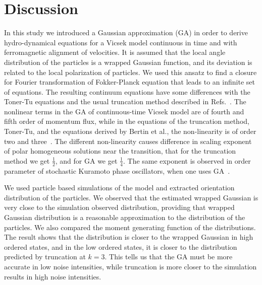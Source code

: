\documentclass[reprint,floatfix,amsmath,amssymb,aps,pre,showkeys,showpacs,superscriptaddress]{revtex4-1}
\newcommand{\hl}[1]{\textcolor{hlcolor}{#1}}
\begin{document}
\section{Discussion}

In this study we introduced a Gaussian approximation (GA) in order to derive hydro-dynamical equations for a Vicsek model continuous in time and with ferromagnetic alignment of velocities. It is assumed that the local angle distribution of the particles is a wrapped Gaussian function, and its deviation is related to the local polarization of particles. We used this ansatz to find a closure for Fourier transformation of Fokker-Planck equation that leads to an infinite set of equations. The resulting continuum equations have some differences with the Toner-Tu equations and the usual truncation method described in Refs.~\cite{Bertin2006,Bertin2009}. The nonlinear terms in the GA of continuous-time Vicsek model are of \hl{fourth} and fifth order of momentum flux, while in the equations of the truncation method, \hl{Toner-Tu, and the equations derived by Bertin et al.}, the non-linearity is of order two and three~\cite{Bertin2006,Bertin2009,Toner1995}. The different non-linearity causes difference in scaling exponent of polar homogeneous solutions near the transition, that for the truncation method we get $\frac{1}{2}$, and for GA we get $\frac{1}{4}$. The same exponent is observed in order parameter of stochastic Kuramoto phase oscillators, when one uses GA~\cite{sonnenschein2013approximate,sonnenschein2013excitable,sonnenschein2014cooperative,Sonnenschein2015}.

We used particle based simulations of the model and extracted orientation distribution of the particles. We observed that the estimated wrapped Gaussian is very close to the simulation observed distribution, providing that  wrapped Gaussian distribution is a reasonable approximation to the distribution of the particles. We also compared the moment generating function of the distributions. The result shows that the distribution is closer to the wrapped Gaussian in high ordered states, and in the low ordered states, it is closer to the distribution predicted by truncation at $k=3$. This tells us that the GA must be more accurate in low noise intensities, while truncation is more closer to the simulation results in high noise intensities.
\end{document}
